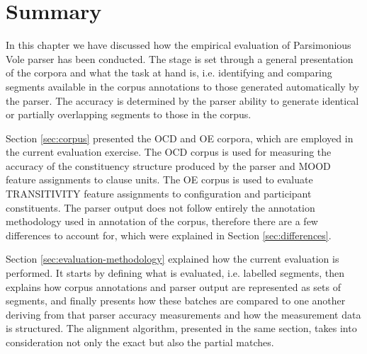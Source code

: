     
    

\section{Summary}
\label{sec:evaluation-discussion}
    
    In this chapter we have discussed how the empirical evaluation of Parsimonious Vole parser has been conducted. The stage is set through a general presentation of the corpora and what the task at hand is, i.e. identifying and comparing segments available in the corpus annotations to those generated automatically by the parser. The accuracy is determined by the parser ability to generate identical or partially overlapping segments to those in the corpus.
    
    Section \ref{sec:corpus} presented the OCD and OE corpora, which are employed in the current evaluation exercise. The OCD corpus is used for measuring the accuracy of the constituency structure produced by the parser and MOOD feature assignments to clause units. The OE corpus is used to evaluate TRANSITIVITY feature assignments to configuration and participant constituents. The parser output does not follow entirely the annotation methodology used in annotation of the corpus, therefore there are a few differences to account for, which were explained in Section \ref{sec:differences}. 
    
    Section \ref{sec:evaluation-methodology} explained how the current evaluation is performed. It starts by defining what is evaluated, i.e. labelled segments, then explains how corpus annotations and parser output are represented as sets of segments, and finally presents how these batches are compared to one another deriving from that parser accuracy measurements and how the measurement data is structured. The alignment algorithm, presented in the same section, takes into consideration not only the exact but also the partial matches. %
    

